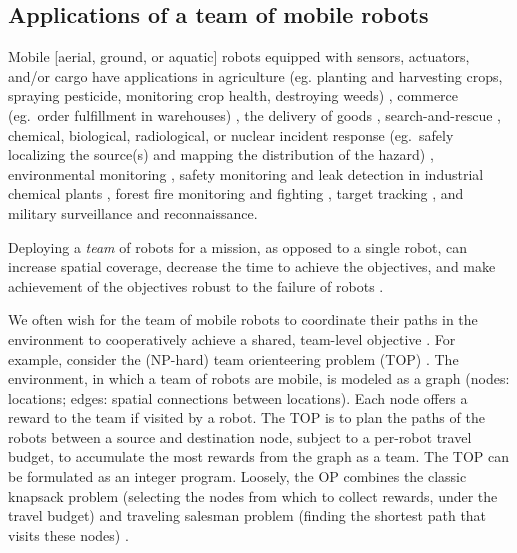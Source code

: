 \documentclass[11pt, oneside]{article}
\begin{document}
\subsection{Applications of a team of mobile robots}
Mobile [aerial, ground, or aquatic] robots equipped with sensors, actuators, and/or cargo have applications in agriculture (eg. planting and harvesting crops, spraying pesticide, monitoring crop health, destroying weeds) \cite{santos2020path,bawden2017robot,mcallister2018multi}, commerce (eg.\ order fulfillment in warehouses) \cite{wurman2008coordinating}, the delivery of goods \cite{coelho2014thirty}, search-and-rescue \cite{queralta2020collaborative}, chemical, biological, radiological, or nuclear incident response (eg.\ safely localizing the source(s) and mapping the distribution of the hazard) \cite{murphy2012projected,hutchinson2019unmanned}, environmental monitoring \cite{dunbabin2012robots,hernandez2012mobile,yuan2020maritime}, safety monitoring and leak detection in industrial chemical plants \cite{soldan2014towards,francis2022gas}, forest fire monitoring and fighting \cite{merino2012unmanned}, target tracking \cite{robin2016multi}, and military surveillance and reconnaissance. 

Deploying a \emph{team} of robots for a mission, as opposed to a single robot, can increase spatial coverage, decrease the time to achieve the objectives, and make achievement of the objectives robust to the failure of robots \cite{schranz2020swarm,brambilla2013swarm}.

We often wish for the team of mobile robots to coordinate their paths in the environment to cooperatively achieve a shared, team-level objective \cite{parker1995design,parker2007distributed}.
For example, consider the (NP-hard) team orienteering \cite{golden1987orienteering} problem (TOP) \cite{chao1996team,gunawan2016orienteering,vansteenwegen2011orienteering}. 
The environment, in which a team of robots are mobile, is modeled as a graph (nodes: locations; edges: spatial connections between locations). Each node offers a reward to the team if visited by a robot.
The TOP is to plan the paths of the robots between a source and destination node, subject to a per-robot travel budget, to accumulate the most rewards from the graph as a team. The TOP can be formulated as an integer program. Loosely, the OP combines the classic knapsack problem (selecting the nodes from which to collect rewards, under the travel budget) and traveling salesman problem (finding the shortest path that visits these nodes) \cite{vansteenwegen2011orienteering}.
\end{document}
